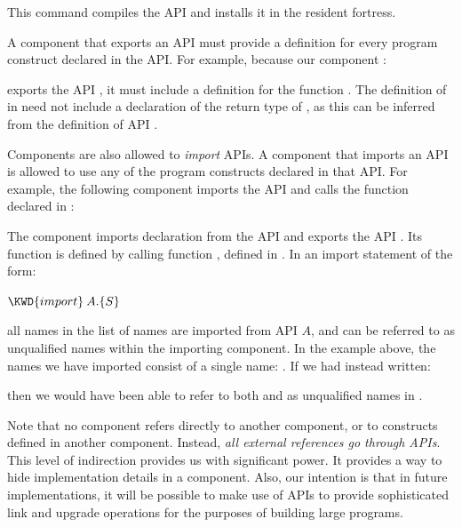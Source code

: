 This command compiles the API 
and installs it in the resident fortress.

A component that exports an API must provide a definition
for every program construct declared in the API. For example, because
our component :

exports the API , it must include a definition for the
function .
The definition of  in  need not include
a declaration of the
return type of , as this can be inferred
from the
definition of API .

Components are also allowed to \emph{import} APIs. A component that
imports an API is allowed to use any of the program constructs
declared in that API. For example, the following component imports the API
 and calls the function  declared in :


The component  imports declaration  from the API 
and exports the API
. Its  function is defined by calling function
, defined in .
In an import statement of the form:
\begin{Fortress}
\(\KWD{import}\:A.\{S\}\)
\end{Fortress}
all names in the list of names  are imported from API $A$, and can be
referred to as unqualified names within the importing component. In
the example above, the names we have imported consist of a
single name: . If we had instead written:

then we would have been able to refer to both  and 
as unqualified names in .

Note that no component refers directly to another component,
or to constructs defined in another component.
Instead, \emph{all external references go through APIs}.
This level of indirection provides us with significant power.
It provides a way to hide implementation details in a component.
Also, our intention is that in future implementations,
it will be possible to make use of APIs to provide sophisticated
link and upgrade operations for the purposes of building
large programs.

